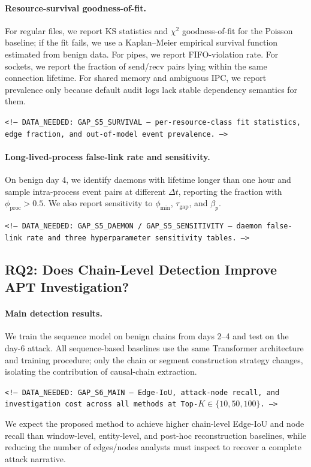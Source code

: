 \paragraph{Resource-survival goodness-of-fit.} For regular files, we report KS statistics and $\chi^2$ goodness-of-fit for the Poisson baseline; if the fit fails, we use a Kaplan--Meier empirical survival function estimated from benign data. For pipes, we report FIFO-violation rate. For sockets, we report the fraction of send/recv pairs lying within the same connection lifetime. For shared memory and ambiguous IPC, we report prevalence only because default audit logs lack stable dependency semantics for them.
\begin{flushleft}\small\texttt{<!-- DATA\_NEEDED: GAP\_S5\_SURVIVAL --- per-resource-class fit statistics, edge fraction, and out-of-model event prevalence. -->}\end{flushleft}

\paragraph{Long-lived-process false-link rate and sensitivity.} On benign day 4, we identify daemons with lifetime longer than one hour and sample intra-process event pairs at different $\Delta t$, reporting the fraction with $\phi_{\text{proc}}>0.5$. We also report sensitivity to $\phi_{\min}$, $\tau_{\text{gap}}$, and $\beta_p$.
\begin{flushleft}\small\texttt{<!-- DATA\_NEEDED: GAP\_S5\_DAEMON / GAP\_S5\_SENSITIVITY --- daemon false-link rate and three hyperparameter sensitivity tables. -->}\end{flushleft}

\subsection{RQ2: Does Chain-Level Detection Improve APT Investigation?}

\paragraph{Main detection results.} We train the sequence model on benign chains from days 2--4 and test on the day-6 attack. All sequence-based baselines use the same Transformer architecture and training procedure; only the chain or segment construction strategy changes, isolating the contribution of causal-chain extraction.
\begin{flushleft}\small\texttt{<!-- DATA\_NEEDED: GAP\_S6\_MAIN --- Edge-IoU, attack-node recall, and investigation cost across all methods at Top-$K\in\{10,50,100\}$. -->}\end{flushleft}
We expect the proposed method to achieve higher chain-level Edge-IoU and node recall than window-level, entity-level, and post-hoc reconstruction baselines, while reducing the number of edges/nodes analysts must inspect to recover a complete attack narrative.

